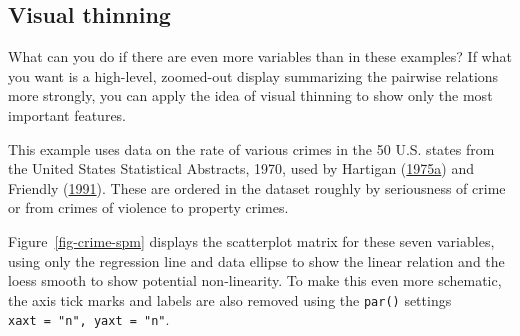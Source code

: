 \documentclass[
  letterpaper,
  10pt,
  krantz2]{krantz}
\makeatletter
\newenvironment{Shaded}{\begin{snugshade}}{\end{snugshade}}
\newcommand{\AttributeTok}[1]{\textcolor[rgb]{0.40,0.45,0.13}{#1}}
\newcommand{\CommentTok}[1]{\textcolor[rgb]{0.37,0.37,0.37}{#1}}
\newcommand{\FunctionTok}[1]{\textcolor[rgb]{0.28,0.35,0.67}{#1}}
\newcommand{\NormalTok}[1]{\textcolor[rgb]{0.00,0.23,0.31}{#1}}
\newcommand{\StringTok}[1]{\textcolor[rgb]{0.13,0.47,0.30}{#1}}
\newenvironment{kframe}{%
  \medskip{}
  \setlength{\fboxsep}{.8em}
  \def\at@end@of@kframe{}%
  \ifinner\ifhmode%
  \def\at@end@of@kframe{\end{minipage}}%
  \begin{minipage}{\columnwidth}%
  \fi\fi%
  \def\FrameCommand##1{\hskip\@totalleftmargin \hskip-\fboxsep
  \colorbox{shadecolor}{##1}\hskip-\fboxsep
      \hskip-\linewidth \hskip-\@totalleftmargin \hskip\columnwidth}%
  \MakeFramed {\advance\hsize-\width
    \@totalleftmargin\z@ \linewidth\hsize
    \@setminipage}}%
{\par\unskip\endMakeFramed%
  \at@end@of@kframe}
\renewenvironment{Shaded}{\begin{kframe}}{\end{kframe}}
\makeatother
\begin{document}
\hypertarget{visual-thinning}{%
\subsection{Visual thinning}\label{visual-thinning}}

What can you do if there are even more variables than in these examples?
If what you want is a high-level, zoomed-out display summarizing the
pairwise relations more strongly, you can apply the idea of visual
thinning to show only the most important features.

This example uses data on the rate of various crimes in the 50 U.S.
states from the United States Statistical Abstracts, 1970, used by
Hartigan (\protect\hyperlink{ref-Hartigan:75}{1975a}) and Friendly
(\protect\hyperlink{ref-Friendly:91}{1991}). These are ordered in the
dataset roughly by seriousness of crime or from crimes of violence to
property crimes.

\begin{Shaded}
\end{Shaded}

Figure~\ref{fig-crime-spm} displays the scatterplot matrix for these
seven variables, using only the regression line and data ellipse to show
the linear relation and the loess smooth to show potential
non-linearity. To make this even more schematic, the axis tick marks and
labels are also removed using the \texttt{par()} settings
\texttt{xaxt\ =\ "n",\ yaxt\ =\ "n"}.
\end{document}
